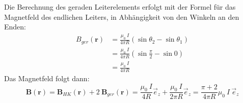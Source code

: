 \documentclass[11pt a4paper]{article}
\begin{document}
Die Berechnung des geraden Leiterelements erfolgt mit der Formel für das
Magnetfeld des endlichen Leiters, in Abhängigkeit von den  Winkeln an den 
Enden:
\begin{align*}
	B_{ger} (\mathbf r)
	&= \frac{\mu_0 \ I}{4 \pi R} 
	(\sin \theta_2 - \sin \theta_1) \\
	&= \frac{\mu_0 \ I}{4 \pi R} 
	\left( \sin \frac\pi2 - \sin 0 \right) \\
	&= \frac{\mu_0 \ I}{4\pi R}
\end{align*}
Das Magnetfeld folgt dann:
\[
	\mathbf B(\mathbf r) = \mathbf B_{HK}(\mathbf r) +
	2 \ \mathbf B_{ger} (\mathbf r)
	= \frac{\mu_0 \ I}{4R} \vec e_z + \frac{\mu_0 \ I}{2\pi R} \vec e_z
	= \frac{\pi + 2}{4\pi R} \mu_0 \ I \ \vec e_z
	\]

\newpage
\setlength{\headheight}{0cm}
\end{document}
